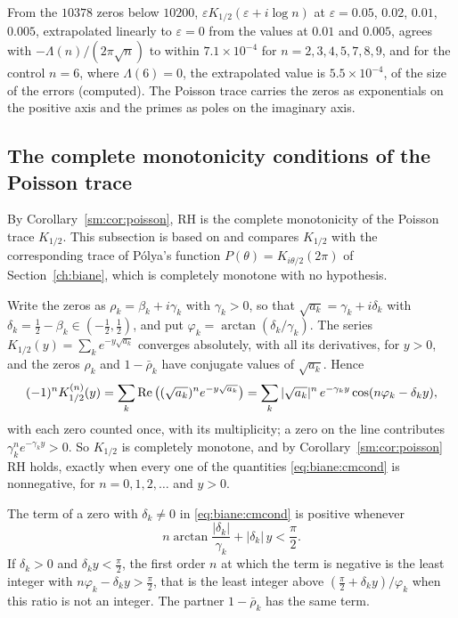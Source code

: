 From the $10378$ zeros below $10200$, $\varepsilon K_{1/2}(\varepsilon+i\log n)$ at $\varepsilon=0.05$, $0.02$, $0.01$, $0.005$, extrapolated linearly to $\varepsilon=0$ from the values at $0.01$ and $0.005$, agrees with $-\Lambda(n)/(2\pi\sqrt n)$ to within $7.1\times10^{-4}$ for $n=2,3,4,5,7,8,9$, and for the control $n=6$, where $\Lambda(6)=0$, the extrapolated value is $5.5\times10^{-4}$, of the size of the errors (computed). The Poisson trace carries the zeros as exponentials on the positive axis and the primes as poles on the imaginary axis.

\subsection{The complete monotonicity conditions of the Poisson trace}\label{sec:biane:cm}

By Corollary~\ref{sm:cor:poisson}, RH is the complete monotonicity of the Poisson trace $K_{1/2}$. This subsection is based on \cite{P26bia} and compares $K_{1/2}$ with the corresponding trace of P\'olya's function $P(\theta)=K_{i\theta/2}(2\pi)$ of Section~\ref{ch:biane}, which is completely monotone with no hypothesis.

Write the zeros as $\rho_k=\beta_k+i\gamma_k$ with $\gamma_k>0$, so that $\sqrt{a_k}=\gamma_k+i\delta_k$ with $\delta_k=\frac12-\beta_k\in(-\frac12,\frac12)$, and put $\varphi_k=\arctan(\delta_k/\gamma_k)$. The series $K_{1/2}(y)=\sum_ke^{-y\sqrt{a_k}}$ converges absolutely, with all its derivatives, for $y>0$, and the zeros $\rho_k$ and $1-\bar\rho_k$ have conjugate values of $\sqrt{a_k}$. Hence
\begin{equation}\label{eq:biane:cmcond}
(-1)^nK_{1/2}^{(n)}(y)=\sum_k\operatorname{Re}\big((\sqrt{a_k})^ne^{-y\sqrt{a_k}}\big)=\sum_k|\sqrt{a_k}|^n\,e^{-\gamma_ky}\cos(n\varphi_k-\delta_ky),
\end{equation}
with each zero counted once, with its multiplicity; a zero on the line contributes $\gamma_k^ne^{-\gamma_ky}>0$. So $K_{1/2}$ is completely monotone, and by Corollary~\ref{sm:cor:poisson} RH holds, exactly when every one of the quantities \eqref{eq:biane:cmcond} is nonnegative, for $n=0,1,2,\dots$ and $y>0$.

\begin{proposition}\label{prop:biane:termwise}
The term of a zero with $\delta_k\ne0$ in \eqref{eq:biane:cmcond} is positive whenever
\[
n\arctan\frac{|\delta_k|}{\gamma_k}+|\delta_k|\,y<\frac\pi2 .
\]
If $\delta_k>0$ and $\delta_ky<\frac\pi2$, the first order $n$ at which the term is negative is the least integer with $n\varphi_k-\delta_ky>\frac\pi2$, that is the least integer above $(\frac\pi2+\delta_ky)/\varphi_k$ when this ratio is not an integer. The partner $1-\bar\rho_k$ has the same term.
\end{proposition}

